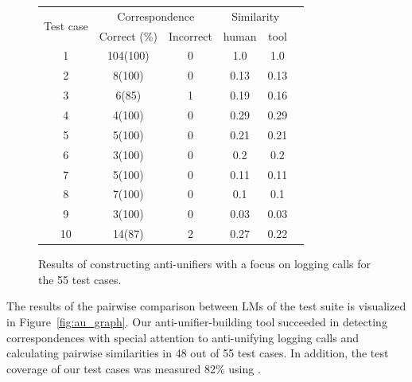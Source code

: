 \begin{figure}
  \centering
  \begin{tabular}{|c|c|c|c|c|c|}
    \hline
    \multirow{2}{*}{Test case}&\multicolumn{2}{c|}{Correspondence}&\multicolumn{2}{c|}{Similarity}\\
    \cline{2-5}
    &Correct (\%)&Incorrect&human&tool\\
    \hline
    1&104(100)&0& 1.0 & 1.0\\
    \hline
    2&8(100)&0& 0.13& 0.13\\
    \hline
    3&6(85)&1&0.19& 0.16\\
    \hline
    4&4(100)&0&0.29 &0.29\\
    \hline
    5&5(100)&0&0.21 &0.21\\
    \hline
    6&3(100)&0&0.2 &0.2\\
    \hline
    7&5(100)&0&0.11 &0.11\\
    \hline
    8&7(100)&0& 0.1&0.1\\
    \hline
    9&3(100)&0&0.03&0.03 \\
    \hline
    10&14(87)&2&0.27 &0.22\\
    \hline

  \end{tabular}
  \caption{Results of constructing anti-unifiers with a focus on logging calls for the 55 test cases.}
  \label{study2_test_cases_results}
\end{figure}

The results of the pairwise comparison between LMs of the test suite is visualized in Figure~\ref{fig:au_graph}. Our anti-unifier-building tool succeeded in detecting correspondences with special attention to anti-unifying logging calls and calculating pairwise similarities in 48 out of 55 test cases. In addition, the test coverage of our test cases was measured 82\% using .

